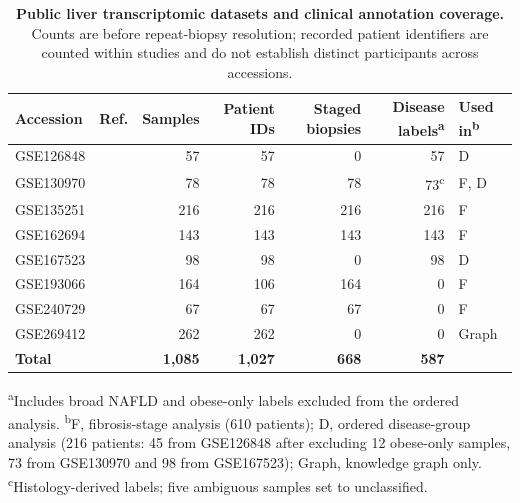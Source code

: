 \documentclass[11pt,a4paper]{article}
\begin{document}
\begin{table}[!t]\centering
\caption{\textbf{Public liver transcriptomic datasets and clinical annotation coverage.} Counts are before repeat-biopsy resolution; recorded patient identifiers are counted within studies and do not establish distinct participants across accessions.}\label{tab:datasets}
\small\setlength{\tabcolsep}{5pt}\renewcommand{\arraystretch}{1.2}
\begin{tabular}{lcrrrrl}
\toprule
\rowcolor{white}\textbf{Accession} & \textbf{Ref.} & \textbf{Samples} & \textbf{Patient IDs} & \textbf{Staged biopsies} & \textbf{Disease labels\textsuperscript{a}} & \textbf{Used in\textsuperscript{b}} \\
\midrule
GSE126848 & \cite{suppli2019} & 57 & 57 & 0 & 57 & D \\
GSE130970 & \cite{hoang2019} & 78 & 78 & 78 & 73\textsuperscript{c} & F, D \\
GSE135251 & \cite{govaere2020} & 216 & 216 & 216 & 216 & F \\
GSE162694 & \cite{pantano2021} & 143 & 143 & 143 & 143 & F \\
GSE167523 & \cite{kozumi2021} & 98 & 98 & 0 & 98 & D \\
GSE193066 & \cite{fujiwara2022} & 164 & 106 & 164 & 0 & F \\
GSE240729 & \cite{verschuren2024} & 67 & 67 & 67 & 0 & F \\
GSE269412 & \cite{steinhauser2025} & 262 & 262 & 0 & 0 & Graph \\
\midrule
\rowcolor{white}\textbf{Total} & & \textbf{1,085} & \textbf{1,027} & \textbf{668} & \textbf{587} & \\
\bottomrule
\end{tabular}
\par\vspace{3pt}
\begin{minipage}{0.92\linewidth}\footnotesize\color{ink2}
\textsuperscript{a}Includes broad NAFLD and obese-only labels excluded from the ordered analysis. \textsuperscript{b}F, fibrosis-stage analysis (610 patients); D, ordered disease-group analysis (216 patients: 45 from GSE126848 after excluding 12 obese-only samples, 73 from GSE130970 and 98 from GSE167523); Graph, knowledge graph only. \textsuperscript{c}Histology-derived labels; five ambiguous samples set to unclassified.
\end{minipage}
\end{table}
\end{document}
